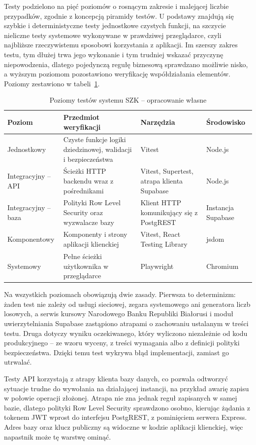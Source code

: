 Testy podzielono na pięć poziomów o rosnącym zakresie i malejącej liczbie przypadków, zgodnie z koncepcją piramidy testów. U podstawy znajdują się szybkie i deterministyczne testy jednostkowe czystych funkcji, na szczycie nieliczne testy systemowe wykonywane w prawdziwej przeglądarce, czyli najbliższe rzeczywistemu sposobowi korzystania z aplikacji. Im szerszy zakres testu, tym dłużej trwa jego wykonanie i tym trudniej wskazać przyczynę niepowodzenia, dlatego pojedynczą regułę biznesową sprawdzano możliwie nisko, a wyższym poziomom pozostawiono weryfikację współdziałania elementów. Poziomy zestawiono w tabeli~\ref{tab:poziomy-testow}.

\begin{table}[htbp]
\centering
\small
\caption{Poziomy testów systemu SZK -- opracowanie własne}
\label{tab:poziomy-testow}
\begin{tabular}{|p{2.4cm}|p{4.4cm}|p{3.6cm}|p{2.6cm}|}
\hline
\textbf{Poziom} & \textbf{Przedmiot weryfikacji} & \textbf{Narzędzia} & \textbf{Środowisko} \\
\hline
Jednostkowy & Czyste funkcje logiki dziedzinowej, walidacji i bezpieczeństwa & Vitest & Node.js \\
\hline
Integracyjny -- API & Ścieżki HTTP backendu wraz z pośrednikami & Vitest, Supertest, atrapa klienta Supabase & Node.js \\
\hline
Integracyjny -- baza & Polityki Row Level Security oraz wyzwalacze bazy & Klient HTTP komunikujący się z PostgREST & Instancja Supabase \\
\hline
Komponentowy & Komponenty i strony aplikacji klienckiej & Vitest, React Testing Library & jsdom \\
\hline
Systemowy & Pełne ścieżki użytkownika w przeglądarce & Playwright & Chromium \\
\hline
\end{tabular}
\end{table}

Na wszystkich poziomach obowiązują dwie zasady. Pierwsza to determinizm: żaden test nie zależy od usługi sieciowej, zegara systemowego ani generatora liczb losowych, a serwis kursowy Narodowego Banku Republiki Białorusi i moduł uwierzytelniania Supabase zastąpiono atrapami o zachowaniu ustalanym w treści testu. Druga dotyczy wyniku oczekiwanego, który wyliczono niezależnie od kodu produkcyjnego -- ze wzoru wyceny, z treści wymagania albo z definicji polityki bezpieczeństwa. Dzięki temu test wykrywa błąd implementacji, zamiast go utrwalać.

Testy API korzystają z atrapy klienta bazy danych, co pozwala odtworzyć sytuacje trudne do wywołania na działającej instancji, na przykład awarię zapisu w połowie operacji złożonej. Atrapa nie zna jednak reguł zapisanych w samej bazie, dlatego polityki Row Level Security sprawdzono osobno, kierując żądania z tokenem JWT wprost do interfejsu PostgREST, z pominięciem serwera Express. Adres bazy oraz klucz publiczny są widoczne w kodzie aplikacji klienckiej, więc napastnik może tę warstwę ominąć.
